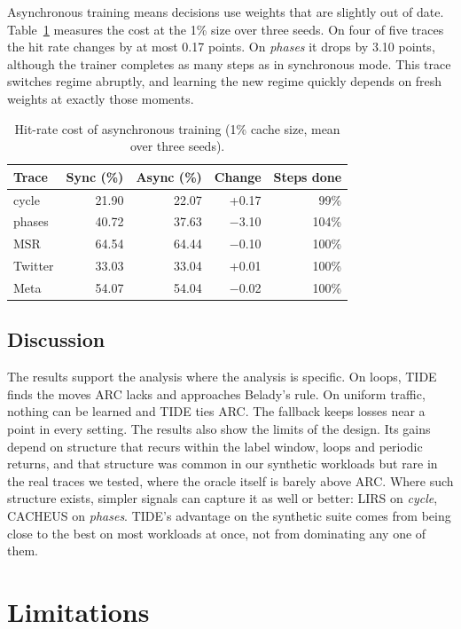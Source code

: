 \documentclass{llncs}
\begin{document}
Asynchronous training means decisions use weights that are slightly out of date. Table~\ref{tab:async} measures the cost at the 1\% size over three seeds. On four of five traces the hit rate changes by at most 0.17 points. On \emph{phases} it drops by 3.10 points, although the trainer completes as many steps as in synchronous mode. This trace switches regime abruptly, and learning the new regime quickly depends on fresh weights at exactly those moments.

\begin{table}[htbp]
\centering
\caption{Hit-rate cost of asynchronous training (1\% cache size, mean over three seeds).}
\label{tab:async}
\begin{tabular}{lrrrr}
\toprule
Trace & Sync (\%) & Async (\%) & Change & Steps done \\
\midrule
cycle & 21.90 & 22.07 & +0.17 & 99\% \\
phases & 40.72 & 37.63 & $-$3.10 & 104\% \\
MSR & 64.54 & 64.44 & $-$0.10 & 100\% \\
Twitter & 33.03 & 33.04 & +0.01 & 100\% \\
Meta & 54.07 & 54.04 & $-$0.02 & 100\% \\
\bottomrule
\end{tabular}
\end{table}

\subsection{Discussion}

The results support the analysis where the analysis is specific. On loops, TIDE finds the moves ARC lacks and approaches Belady's rule. On uniform traffic, nothing can be learned and TIDE ties ARC. The fallback keeps losses near a point in every setting. The results also show the limits of the design. Its gains depend on structure that recurs within the label window, loops and periodic returns, and that structure was common in our synthetic workloads but rare in the real traces we tested, where the oracle itself is barely above ARC. Where such structure exists, simpler signals can capture it as well or better: LIRS on \emph{cycle}, CACHEUS on \emph{phases}. TIDE's advantage on the synthetic suite comes from being close to the best on most workloads at once, not from dominating any one of them.

\section{Limitations}
\label{sec:limits}
\end{document}
